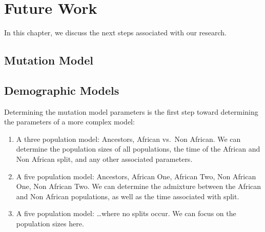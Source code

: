 \chapter{Future Work}\label{ch:futureWork}
In this chapter, we discuss the next steps associated with our research.

\section{Mutation Model}\label{sec:mutationModel}

\section{Demographic Models}\label{sec:demographicModels}

Determining the mutation model parameters is the first step toward determining the parameters of a more complex model:
\begin{enumerate}
    \item A three population model: Ancestors, African vs.\ Non African.
        We can determine the population sizes of all populations, the time of the African and Non African split, and
        any other associated parameters.
    \item A five population model: Ancestors, African One, African Two, Non African One, Non African Two.
        We can determine the admixture between the African and Non African populations, as well as the time associated
        with split.
    \item A five population model: \ldots where no splits occur.
        We can focus on the population sizes here.
\end{enumerate}